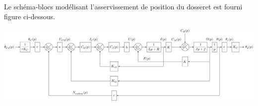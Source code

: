 \documentclass[10pt,fleqn]{article} %
\begin{document}
\begin{multicols}{2}

Le  schéma-blocs modélisant l'asservissement de position du dosseret est fourni figure ci-dessous.
%

%
%

\begin{center}
\includegraphics[width=1\linewidth]{images/schema_bloc.jpg}


\end{center}
\end{multicols}
\end{document}
